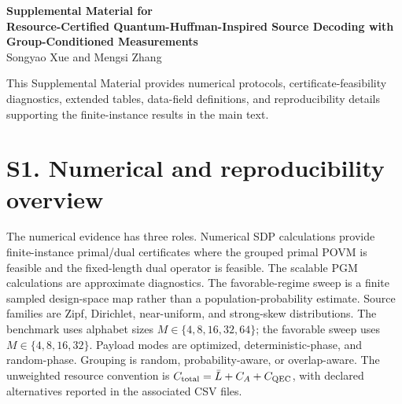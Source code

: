 \documentclass[10pt]{article}
\newcommand{\suppsection}[1]{\section*{#1}}
\begin{document}
\begin{center}
{\Large \textbf{Supplemental Material for}}\\[0.4em]
{\Large \textbf{Resource-Certified Quantum-Huffman-Inspired Source Decoding with Group-Conditioned Measurements}}\\[1em]
Songyao Xue and Mengsi Zhang
\end{center}

\noindent This Supplemental Material provides numerical protocols, certificate-feasibility diagnostics, extended tables, data-field definitions, and reproducibility details supporting the finite-instance results in the main text.

\suppsection{S1. Numerical and reproducibility overview}
The numerical evidence has three roles. Numerical SDP calculations provide finite-instance primal/dual certificates where the grouped primal POVM is feasible and the fixed-length dual operator is feasible. The scalable PGM calculations are approximate diagnostics. The favorable-regime sweep is a finite sampled design-space map rather than a population-probability estimate. Source families are Zipf, Dirichlet, near-uniform, and strong-skew distributions. The benchmark uses alphabet sizes $M\in\{4,8,16,32,64\}$; the favorable sweep uses $M\in\{4,8,16,32\}$. Payload modes are optimized, deterministic-phase, and random-phase. Grouping is random, probability-aware, or overlap-aware. The unweighted resource convention is $C_{\rm total}=\bar L+C_A+C_{\rm QEC}$, with declared alternatives reported in the associated CSV files.
\end{document}
